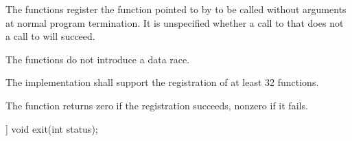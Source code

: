\begin{itemdescr}
\pnum
\effects
The
functions register the function pointed to by 
to be called without arguments at normal program termination.
It is unspecified whether a call to  that does not
a call to  will succeed.
\begin{note}
The  functions do not introduce a data
race.
\end{note}

\pnum
\implimits
The implementation shall support the registration of at least 32 functions.

\pnum
\returns
The
function returns zero if the registration succeeds,
nonzero if it fails.
\end{itemdescr}

\begin{indexed}{}
\begin{itemdecl}
[[noreturn]] void exit(int status);
\end{itemdecl}
\end{indexed}

